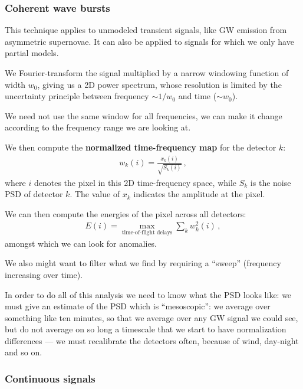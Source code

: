 \documentclass[main.tex]{subfiles}
\begin{document}
\subsubsection{Coherent wave bursts}

This technique applies to unmodeled transient signals, like GW emission from asymmetric supernovae. It can also be applied to signals for which we only have partial models. 

We Fourier-transform the signal multiplied by a narrow windowing function of width \(w_0 \), giving us a 2D power spectrum, whose resolution is limited by the uncertainty principle between frequency \(\sim 1/ w_0 \) and time (\(\sim w_0 \)).

We need not use the same window for all frequencies, we can make it change according to the frequency range we are looking at.

We then compute the \textbf{normalized time-frequency map} for the detector \(k\): 
%
\begin{align}
w_k (i) = \frac{x_k(i)}{\sqrt{S_k (i)}}
\,,
\end{align}
%
where \(i\) denotes the pixel in this 2D time-frequency space, while \(S_k\) is the noise PSD of detector \(k\). 
The value of \(x_k\) indicates the amplitude at the pixel.

We can then compute the energies of the pixel across all detectors: 
%
\begin{align}
E(i) = \max_{\text{time-of-flight delays}} \sum _{k} w_k^2(i)
\,,
\end{align}
%
amongst which we can look for anomalies.

We also might want to filter what we find by requiring a ``sweep'' (frequency increasing over time). 


In order to do all of this analysis we need to know what the PSD looks like: we must give an estimate of the PSD which is ``mesoscopic'': we average over something like ten minutes, so that we average over any GW signal we could see, but do not average on so long a timescale that we start to have normalization differences --- we must recalibrate the detectors often, because of wind, day-night and so on.

\subsubsection{Continuous signals}
\end{document}
